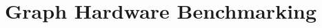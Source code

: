\renewcommand{\thechapter}{3}
\chapter{Graph Hardware Benchmarking}
\label{chapter:30-Graph-Hardware-Benchmarking}












